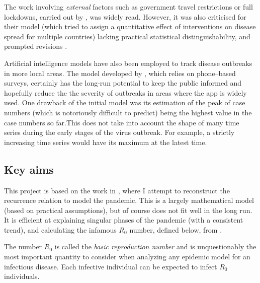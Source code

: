 The work involving \textit{external} factors such as government travel restrictions or full lockdowns, carried out by \cite{flaxman20}, was widely read. However, it was also criticised for their model (which tried to assign a quantitative effect of interventions on disease spread for multiple countries) lacking practical statistical distinguishability, and prompted revisions \cite{flaxman20reply}.

Artificial intelligence models have also been employed to track disease outbreaks in more local areas. The model developed by \cite{SrinivasaRao2020}, which relies on phone–based surveys, certainly has the long-run potential to keep the public informed and hopefully reduce the the severity of outbreaks in areas where the app is widely used. One drawback of the initial model was its estimation of the peak of case numbers (which is notoriously difficult to predict) being the highest value in the case numbers so far.This does not take into account the shape of many time series during the early stages of the virus outbreak. For example, a strictly increasing time series would have its maximum at the latest time.


\subsection{Key aims}

This project is based on the work in \cite{grigor20}, where I attempt to reconstruct the recurrence relation to model the pandemic. This is a largely mathematical model (based on practical assumptions), but of course does not fit well in the long run. It is efficient at explaining singular phases of the pandemic (with a consistent trend), and calculating the infamous $R_0$ number, defined below, from \cite{epid08}. 

\begin{ndefinition} 
The number $R_0$ is called
the \textit{basic reproduction number} and is unquestionably the most important quantity to consider when analyzing any epidemic model for an infectious disease. Each infective individual can be expected to infect $R_0$ individuals. 
\end{ndefinition}

